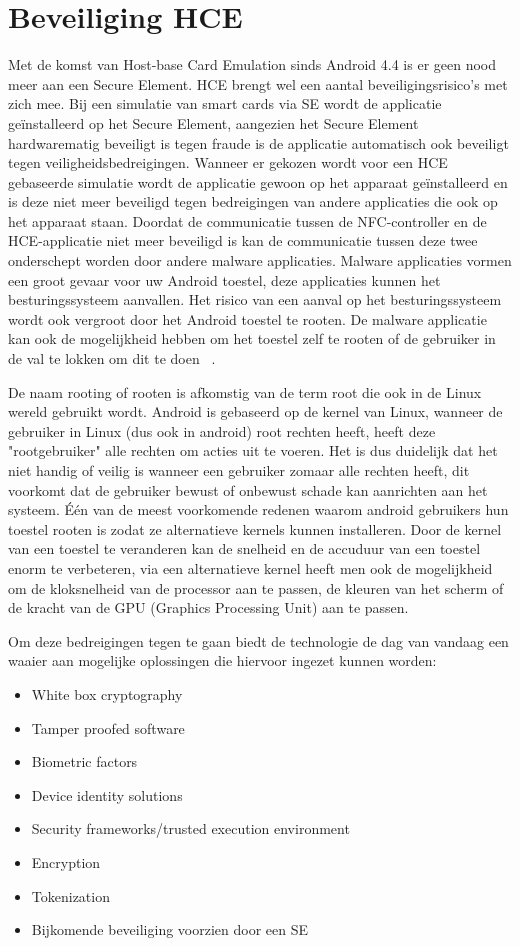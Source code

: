 \section{Beveiliging HCE}
\label{sec:Beveiliging}
Met de komst van Host-base Card Emulation sinds Android 4.4 is er geen nood meer aan een Secure Element. HCE brengt wel een aantal beveiligingsrisico's met zich mee. Bij een simulatie van smart cards via SE wordt de applicatie geïnstalleerd op het Secure Element, aangezien het Secure Element hardwarematig beveiligt is tegen fraude is de applicatie automatisch ook beveiligt tegen veiligheidsbedreigingen. Wanneer er gekozen wordt voor een HCE gebaseerde simulatie wordt de applicatie gewoon op het apparaat geïnstalleerd en is deze niet meer beveiligd tegen bedreigingen van andere applicaties die ook op het apparaat staan.
Doordat de communicatie tussen de NFC-controller en de HCE-applicatie niet meer beveiligd is kan de communicatie tussen deze twee onderschept worden door andere malware applicaties. Malware applicaties vormen een groot gevaar voor uw Android toestel, deze applicaties kunnen het besturingssysteem aanvallen. Het risico van een aanval op het besturingssysteem wordt ook vergroot door het Android toestel te rooten. De malware applicatie kan ook de mogelijkheid hebben om het toestel zelf te rooten of de gebruiker in de val te lokken om dit te doen ~\autocite{SCA2014}.

De naam rooting of rooten is afkomstig van de term root die ook in de Linux wereld gebruikt wordt. Android is gebaseerd op de kernel van Linux, wanneer de gebruiker in Linux (dus ook in android) root rechten heeft, heeft deze "rootgebruiker" alle rechten om acties uit te voeren. Het is dus duidelijk dat het niet handig of veilig is wanneer een gebruiker zomaar alle rechten heeft, dit voorkomt dat de gebruiker bewust of onbewust schade kan aanrichten aan het systeem. Één van de meest voorkomende redenen waarom android gebruikers hun toestel rooten is zodat ze alternatieve kernels kunnen installeren. Door de kernel van een toestel te veranderen kan de snelheid en de accuduur van een toestel enorm te verbeteren, via een alternatieve kernel heeft men ook de mogelijkheid om de kloksnelheid van de processor aan te passen, de kleuren van het scherm of de kracht van de GPU (Graphics Processing Unit) aan te passen.
 
Om deze bedreigingen tegen te gaan biedt de technologie de dag van vandaag een waaier aan mogelijke oplossingen die hiervoor ingezet kunnen worden:

\begin{itemize}
	\item White box cryptography
	\item Tamper proofed software
	\item Biometric factors
	\item Device identity solutions
	\item Security frameworks/trusted execution environment
	\item Encryption
	\item Tokenization
	\item Bijkomende beveiliging voorzien door een SE
\end{itemize}

